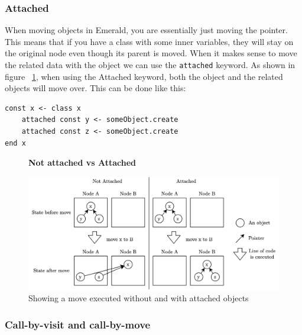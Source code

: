 \subsubsection{Attached}
When moving objects in Emerald, you are essentially just moving the pointer. This means that if you have a class with some inner variables, they will stay on the original node even though its parent is moved. When it makes sense to move the related data with the object we can use the \verb|attached| keyword.
As shown in figure ~\ref{fig:emerald_attached_figure}, when using the Attached keyword, both the object and the related objects will move over. This can be done like this:
\begin{lstlisting}[language=emerald]
const x <- class x
    attached const y <- someObject.create
    attached const z <- someObject.create
end x
\end{lstlisting}

\begin{figure}[t]
    \centering
    \textbf{Not attached vs Attached}\par\medskip
    \includegraphics[scale=0.8]{chapters/background/emerald_attached.png}
    \caption{Showing a move executed without and with attached objects}
    \label{fig:emerald_attached_figure}
\end{figure}

\subsubsection{Call-by-visit and call-by-move}

